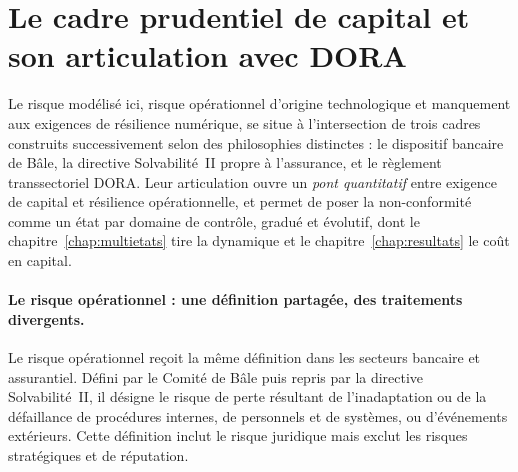 \section{Le cadre prudentiel de capital et son articulation avec DORA}



Le risque modélisé ici, risque opérationnel d'origine technologique et manquement aux
exigences de résilience numérique, se situe à l'intersection de trois cadres construits
successivement selon des philosophies distinctes : le dispositif bancaire de Bâle, la directive
Solvabilité~II propre à l'assurance, et le règlement transsectoriel DORA. Leur articulation
ouvre un \emph{pont quantitatif} entre exigence de capital et résilience opérationnelle, et
permet de poser la non-conformité comme un état par domaine de contrôle, gradué et évolutif,
dont le chapitre~\ref{chap:multietats} tire la dynamique et le chapitre~\ref{chap:resultats}
le coût en capital.



\paragraph{Le risque opérationnel : une définition partagée, des traitements divergents.}
Le risque opérationnel reçoit la même définition dans les secteurs bancaire et
assurantiel. Défini par le Comité de Bâle puis repris par la directive Solvabilité~II,
il désigne le risque de perte résultant de l'inadaptation ou de la défaillance de
procédures internes, de personnels et de systèmes, ou d'événements extérieurs. Cette
définition inclut le risque juridique mais exclut les risques stratégiques et de
réputation.


